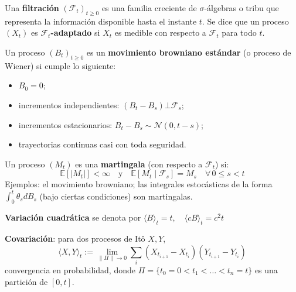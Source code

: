 \begin{f}
	
	Una \textbf{filtración} \((\mathcal{F}_t)_{t \geq 0}\) es una familia creciente de \(\sigma\)-álgebras o tribu que representa la información disponible hasta el instante \(t\). Se dice que un proceso \((X_t)\) es \textbf{\(\mathcal{F}_t\)-adaptado} si \(X_t\) es medible con respecto a \(\mathcal{F}_t\) para todo \(t\).
	
	Un proceso \((B_t)_{t \geq 0}\) es un \textbf{movimiento browniano estándar} (o proceso de Wiener) si cumple lo siguiente:
	\begin{itemize} 
		\item \(B_0 = 0\);
		\item incrementos independientes: \(\left( B_t - B_s\right) \bot\mathcal{F}_s\);
		\item incrementos estacionarios: \(B_t - B_s \sim \mathcal{N}(0, t - s)\);
		\item trayectorias continuas casi con toda seguridad.
	\end{itemize}
	
	Un proceso \((M_t)\) es una \textbf{martingala} (con respecto a \(\mathcal{F}_t\)) si:
	\[
	\mathbb{E}[|M_t|] < \infty \quad \text{y} \quad \mathbb{E}[M_t \mid \mathcal{F}_s] = M_s \quad \forall\, 0 \leq s < t
	\]
	Ejemplos: el movimiento browniano; las integrales estocásticas de la forma \(\int_0^t \theta_s dB_s\) (bajo ciertas condiciones) son martingalas.
	\medskip
	
	\textbf{Variación cuadrática} se denota por \(
	\langle B \rangle_t = t, \quad \langle cB \rangle_t = c^2 t\)
	
	\textbf{Covariación}: para dos procesos de Itô \(X, Y\),
	\[
	\langle X, Y \rangle_t := \lim_{\|\Pi\| \to 0} \sum_{i} (X_{t_{i+1}} - X_{t_i})(Y_{t_{i+1}} - Y_{t_i})
	\]
	convergencia en probabilidad, donde \(\Pi = \{t_0 = 0 < t_1 < \dots < t_n = t\}\) es una partición de \([0,t]\).
	
\end{f}



